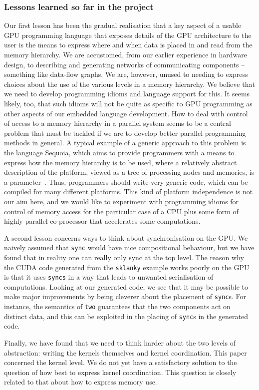 \subsubsection{Lessons learned so far in the project}
Our first lesson has been the gradual realisation that a key aspect of a usable
GPU programming language that exposes details of the GPU architecture to the user is the means to express where and when data is placed in and
read from the memory hierarchy.
We are accustomed, from our earlier experience in hardware design, to describing
and generating networks of communicating components -- something like data-flow graphs. We are, however, unused to needing to express choices about the use
of the various levels in a memory hierarchy. We believe that we need to develop programming idioms and language support for this. It seems likely, too, that such idioms will not be quite as specific to GPU programming as other aspects of our embedded language development. How to deal with control of access to
a memory hierarchy in a parallel system seems to be a central problem that must be tackled if we are to develop better parallel programming methods in general.
A typical example of a generic approach to this problem is
the language Sequoia, which aims to provide programmers with a means
to express how the memory hierarchy is to be used, where a relatively abstract description of
the platform, viewed as a tree of processing nodes and memories, is a parameter~\cite{Sequoia}. Thus, programmers should write very generic code, which can be compiled for many different platforms. This kind of platform independence is not our aim here, and we would like to experiment with programming idioms for control of memory access for the particular case of a CPU plus some form of highly parallel co-processor that accelerates some computations.

A second lesson concerns ways to think about synchronisation on the GPU. We naively assumed that {\tt sync} would have nice compositional behaviour, but we have found that in reality one can really only sync at the top level.
The reason why the CUDA code generated from the {\tt sklanky} example works poorly on the GPU is that it uses {\tt syncs} in a way that leads to unwanted
serialisation of computations. Looking at our generated code, we see that it may be possible to make major improvements by being cleverer about the placement
of {\tt sync}s. For instance, the semantics of {\tt two} guarantees that the two components act on distinct data, and this can be exploited in the placing of {\tt sync}s in the generated code.

Finally, we have found that we need to think harder about the two levels of
abstraction: writing the kernels themselves and kernel coordination. This paper concerned the kernel level. We do not yet have a satisfactory solution to the question of how best to express kernel coordination. This question is closely related to that about how to express memory use.






